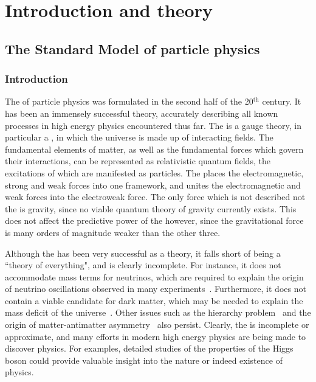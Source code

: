 \chapter{Introduction and theory}
\label{chap:theory}

\section{The Standard Model of particle physics}
\subsection{Introduction}

The \SM of particle physics was formulated in the second half of the 20$^{\text{th}}$ century. It has been an immensely successful theory, accurately describing all known processes in high energy physics encountered thus far. The \SM is a gauge theory, in particular a \QFT, in which the universe is made up of interacting fields. The fundamental elements of matter, as well as the fundamental forces which govern their interactions, can be represented as relativistic quantum fields, the excitations of which are manifested as particles. The \SM places the electromagnetic, strong and weak forces into one framework, and unites the electromagnetic and weak forces into the electroweak force. The only force which is not described not the \SM is gravity, since no viable quantum theory of gravity currently exists. This does not affect the predictive power of the \SM however, since the gravitational force is many orders of magnitude weaker than the other three.




Although the \SM has been very successful as a theory, it falls short of being a “theory of everything", and is clearly incomplete. For instance, it does not accommodate mass terms for neutrinos, which are required to explain the origin of neutrino oscillations observed in many experiments~\cite{SuperK,SNO,DayaBay}. Furthermore, it does not contain a viable candidate for dark matter, which may be needed to explain the mass deficit of the universe~\cite{DM}. Other issues such as the hierarchy problem~\cite{Hierarchy} and the origin of matter-antimatter asymmetry~\cite{Asymmetry} also persist. Clearly, the \SM is incomplete or approximate, and many efforts in modern high energy physics are being made to discover \BSM physics. For examples, detailed studies of the properties of the Higgs boson could provide valuable insight into the nature or indeed existence of \BSM physics.

